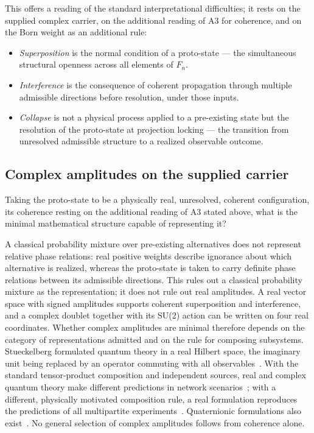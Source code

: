 \documentclass[11pt,a4paper]{article}
\begin{document}
    This offers a reading of the standard interpretational difficulties; it rests on the supplied complex
    carrier, on the additional reading of A3 for coherence, and on the Born weight as an additional rule:
    \begin{itemize}
      \item \emph{Superposition} is the normal condition of a proto-state — the
      simultaneous structural openness across all elements of $F_n$.
      \item \emph{Interference} is the consequence of coherent propagation
      through multiple admissible directions before resolution, under those inputs.
      \item \emph{Collapse} is not a physical process applied to a pre-existing state
      but the resolution of the proto-state at projection locking — the transition
      from unresolved admissible structure to a realized observable outcome.
    \end{itemize}

  \subsection{Complex amplitudes on the supplied carrier}
    \label{subsec:complex-amplitudes}

    Taking the proto-state to be a physically real, unresolved, coherent configuration, its coherence resting
    on the additional reading of A3 stated above, what is the minimal mathematical structure capable of
    representing it?

    A classical probability mixture over pre-existing alternatives does not represent relative
    phase relations: real positive weights describe ignorance about which alternative is realized,
    whereas the proto-state is taken to carry definite phase relations between its admissible
    directions.
    This rules out a classical probability mixture as the representation; it does not rule out real
    amplitudes.
    A real vector space with signed amplitudes supports coherent superposition and interference, and a
    complex doublet together with its SU(2) action can be written on four real coordinates.
    Whether complex amplitudes are minimal therefore depends on the category of representations
    admitted and on the rule for composing subsystems.
    Stueckelberg formulated quantum theory in a real Hilbert space, the imaginary unit being replaced by
    an operator commuting with all observables~\cite{Stueckelberg1960}.
    With the standard tensor-product composition and independent sources, real and complex quantum
    theory make different predictions in network scenarios~\cite{Renou2021}; with a different,
    physically motivated composition rule, a real formulation reproduces the predictions of all
    multipartite experiments~\cite{BarriosHita2026}.
    Quaternionic formulations also exist~\cite{Adler1995}.
    No general selection of complex amplitudes follows from coherence alone.
\end{document}
